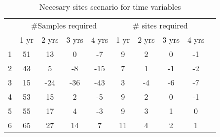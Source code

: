 \begin{table}[htbp]
\caption{Necesary sites scenario for time variables}
\begin{tabular}{ccccc|ccccc}
\cline{2-9}
\multicolumn{1}{c}{} &  \multicolumn{4}{c}{ \#Samples required} & \multicolumn{4}{c}{\# sites required} \\ \cline{2-9}\noalign{\smallskip}
\multicolumn{1}{p{3cm}}{Elevation Bands}  & 1 yr   & 2 yrs  & 3 yrs     & 4 yrs   & 1 yr  & 2 yrs & 3 yrs  & 4 yrs \\ \hline\noalign{\smallskip}
1 &  51 & 13 & 0 & -7 & 9 & 2 & 0 & -1 \\ 
2 &  43 & 5 & -8 & -15 & 7 & 1 & -1 & -2 \\ 
3 &  15 & -24 & -36 & -43 & 3 & -4 & -6 & -7 \\ 
4 &  53 & 15 & 2 & -5 & 9 & 2 & 0 & -1 \\ 
5 &  55 & 17 & 4 & -3 & 9 & 3 & 1 & 0 \\ 
6 &  65 & 27 & 14 & 7 & 11 & 4 & 2 & 1 \\ \hline
\end{tabular}
\label{tab:TVapsenario}
\end{table}